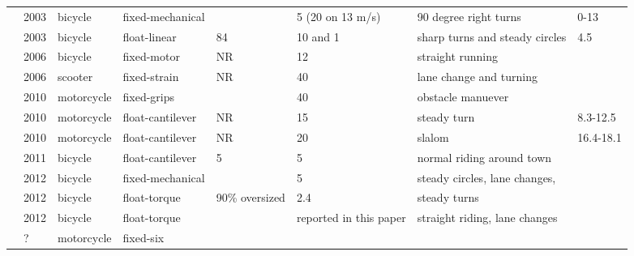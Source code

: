 \documentclass[10pt]{article}
\begin{document}
\begin{table}[!ht]
\begin{tabular}{llllllll}
    \cite{Cheng2003}                      &  2003 &     bicycle &  fixed-mechanical &                   &         5 (20 on 13 m/s) &                   90 degree right turns &        0-13 \\
    \cite{Cheng2003}                      &  2003 &     bicycle &      float-linear &                84 &                 10 and 1 &          sharp turns and steady circles &         4.5 \\
    \cite{Iuchi2006}                      &  2006 &     bicycle &       fixed-motor &                NR &                       12 &                        straight running &             \\
    \cite{Capitani2006}                   &  2006 &     scooter &      fixed-strain &                NR &                       40 &                 lane change and turning &             \\
    \cite{Evertse2010}                    &  2010 &  motorcycle &       fixed-grips &                   &                       40 &                       obstacle manuever &             \\
    \cite{Teerhuis2010}                   &  2010 &  motorcycle &  float-cantilever &                NR &                       15 &                             steady turn &    8.3-12.5 \\
    \cite{Teerhuis2010}                   &  2010 &  motorcycle &  float-cantilever &                NR &                       20 &                                  slalom &   16.4-18.1 \\
    \cite{Ouden2011}                      &  2011 &     bicycle &  float-cantilever &                 5 &                        5 &               normal riding around town &             \\
    \cite{Moore2012}                      &  2012 &     bicycle &  fixed-mechanical &                   &                        5 &          steady circles, lane changes,  &             \\
    \cite{Cain2010,Cain2012}              &  2012 &     bicycle &      float-torque &    90\% oversized &                      2.4 &                            steady turns &             \\
    \cite{Moore2012}                      &  2012 &     bicycle &      float-torque &                   &   reported in this paper &           straight riding, lane changes &             \\
    \cite{Kageyama}                       &     ? &  motorcycle &         fixed-six &                   &                          &                                         &             \\
    \bottomrule
  \end{tabular}
  \label{tab:design}
\end{table}
\end{document}
